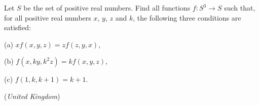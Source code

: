 Let $S$ be the set of positive real numbers. Find all functions $f\colon S^3 \to S$ such that, for all positive real numbers $x$, $y$, $z$ and $k$, the following three conditions are satisfied:

(a) $xf(x,y,z) = zf(z,y,x)$,

(b) $f(x, ky, k^2z) = kf(x,y,z)$,

(c) $f(1, k, k+1) = k+1$.

(\textit{United Kingdom})